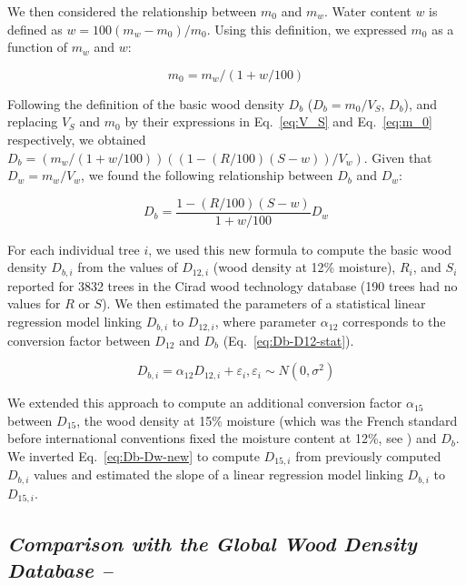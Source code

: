 \documentclass[a4paper, 12pt, leqno, dvipsnames]{article}\usepackage[]{graphicx}\usepackage[]{color}
\begin{document}
We then considered the relationship between $m_0$ and $m_w$. Water content $w$ is defined as $w=100(m_w-m_0)/m_0$. Using this definition, we expressed $m_0$ as a function of $m_w$ and $w$: 

\begin{equation}
  m_0=m_w/(1+w/100)
  \label{eq:m_0}
\end{equation}

Following the definition of the basic wood density $D_b$ ($D_b=m_0/V_S$, $D_b$), and replacing $V_S$ and $m_0$ by their expressions in Eq.~\ref{eq:V_S} and Eq.~\ref{eq:m_0} respectively, we obtained $D_b=(m_w/(1+w/100))((1-(R/100)(S-w))/V_w)$. Given that $D_w=m_w/V_w$, we found the following relationship between $D_b$ and $D_w$:

\begin{equation}
  D_b=\frac{1-(R/100)(S-w)}{1+w/100}D_w
  \label{eq:Db-Dw-new}
\end{equation}

For each individual tree $i$, we used this new formula to compute the basic wood density $D_{b,i}$ from the values of $D_{12,i}$ (wood density at 12\% moisture), $R_i$, and $S_i$ reported for 3832 trees in the Cirad wood technology database (190 trees had no values for $R$ or $S$). We then estimated the parameters of a statistical linear regression model linking $D_{b,i}$ to $D_{12,i}$, where parameter $\alpha_{12}$ corresponds to the conversion factor between $D_{12}$ and $D_b$ (Eq.~\ref{eq:Db-D12-stat}).

\begin{equation}
  D_{b,i}=\alpha_{12} D_{12,i} + \varepsilon_i, \varepsilon_i \sim N(0,\sigma^2)
  \label{eq:Db-D12-stat}
\end{equation}

We extended this approach to compute an additional conversion factor $\alpha_{15}$ between $D_{15}$, the wood density at 15\% moisture (which was the French standard before international conventions fixed the moisture content at 12\%, see \citet{Sallenave1955}) and $D_b$. We inverted Eq.~\ref{eq:Db-Dw-new} to compute $D_{15,i}$ from previously computed $D_{b,i}$ values and estimated the slope of a linear regression model linking $D_{b,i}$ to $D_{15,i}$.

\subsection*{\textit{Comparison with the Global Wood Density Database --}}
\end{document}
